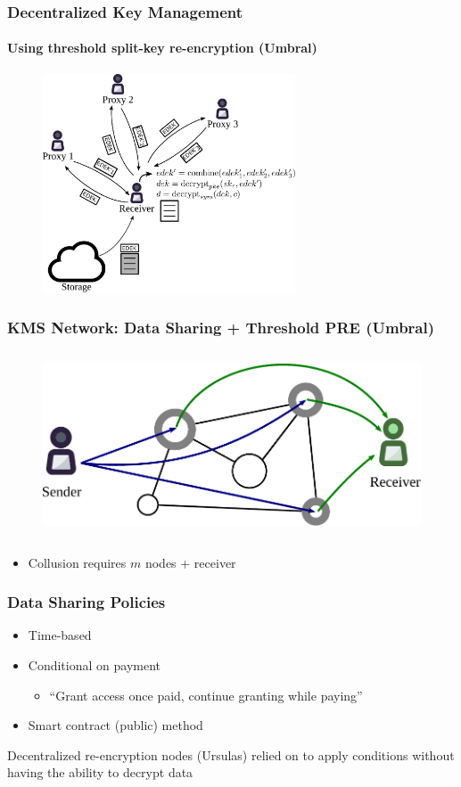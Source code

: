\documentclass[xetex,mathsans,sans,aspectratio=169]{beamer}
\begin{document}
    \begin{frame}
        \frametitle{Decentralized Key Management}
        \framesubtitle{Using threshold split-key re-encryption (Umbral)}
        \begin{figure}
            \centering
            \includegraphics[height=6.5cm]{pdf/decrypt-umbral.pdf}
        \end{figure}
    \end{frame}

    \begin{frame}
        \frametitle{KMS Network: Data Sharing + Threshold PRE (Umbral)}
        \begin{figure}
            \centering
            \includegraphics[height=5.5cm]{pdf/umbralnodes.pdf}
        \end{figure}
        \begin{itemize}
            \item Collusion requires $m$ nodes + receiver
        \end{itemize}
    \end{frame}

   \begin{frame}
        \frametitle{Data Sharing Policies}
        \begin{itemize}
            \setlength\itemsep{1em}
            \item Time-based
            \item Conditional on payment 
            \begin{itemize}
              \item ``Grant access once paid, continue granting while paying''
            \end{itemize}
            \item Smart contract (public) method
        \end{itemize}
        \bigskip
        Decentralized re-encryption nodes (Ursulas) relied on to apply conditions without having the ability to decrypt data
    \end{frame}
\end{document}
